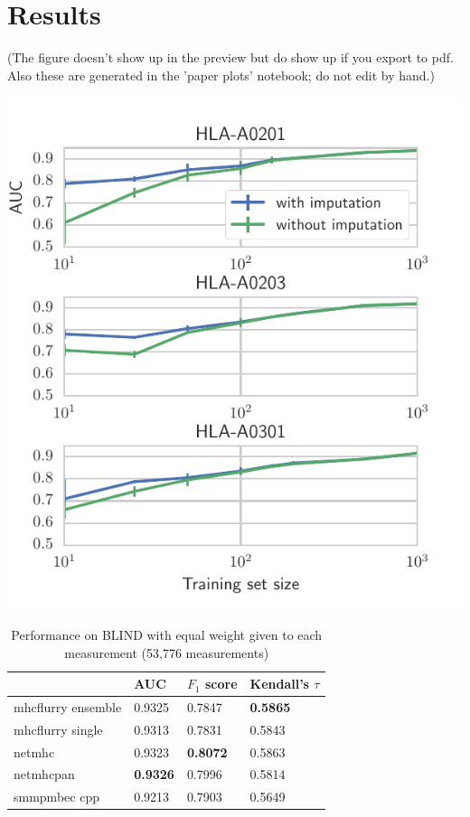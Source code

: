 \section{Results}
(The figure doesn't show up in the preview but do show up if you export to pdf. Also these are generated in the 'paper plots' notebook; do not edit by hand.)

\includegraphics{figures/impute_comparison.pdf}



\begin{table}[h]
\centering
\begin{tabular}{llll}
\toprule
{} &              AUC &      $F_1$ score & Kendall's $\tau$ \\
\midrule
mhcflurry ensemble &           0.9325 &           0.7847 &  \textbf{0.5865} \\
mhcflurry single   &           0.9313 &           0.7831 &           0.5843 \\
netmhc             &           0.9323 &  \textbf{0.8072} &           0.5863 \\
netmhcpan          &  \textbf{0.9326} &           0.7996 &           0.5814 \\
smmpmbec cpp       &           0.9213 &           0.7903 &           0.5649 \\
\bottomrule
\end{tabular}

\caption{Performance on BLIND with equal weight given to each measurement (53,776 measurements)}
\label{tab:measurementweighted}
\end{table}

